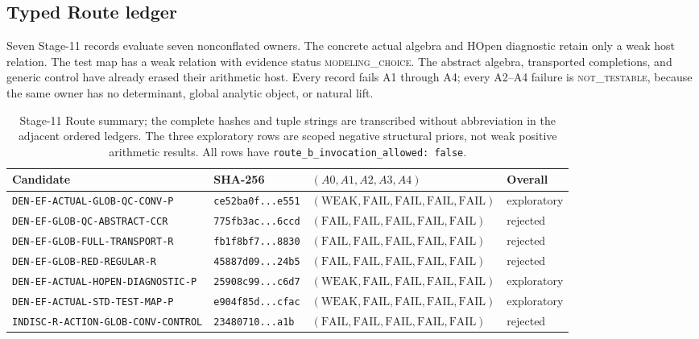 \documentclass[11pt]{article}
\theoremstyle{definition}
\begin{document}
\subsection{Typed Route ledger}

Seven Stage-11 records evaluate seven nonconflated owners.  The concrete
actual algebra and HOpen diagnostic retain only a weak host relation.  The
test map has a weak relation with evidence status \textsc{modeling\_choice}.
The abstract algebra, transported completions, and generic control have
already erased their arithmetic host.  Every record fails A1 through A4;
every A2--A4 failure is \textsc{not\_testable}, because the same owner has no
determinant, global analytic object, or natural lift.

\begin{table}[htbp]
\centering\scriptsize
\caption{Stage-11 Route summary; the complete hashes and tuple strings are
transcribed without abbreviation in the adjacent ordered ledgers.  The three
exploratory rows are scoped negative structural priors, not weak positive
arithmetic results.  All rows have
\texttt{route\_b\_invocation\_allowed: false}.}
\label{tab:route-ledger}
\begin{tabularx}{\textwidth}{P{0.20\textwidth}P{0.22\textwidth}P{0.34\textwidth}Y}
\toprule
Candidate & SHA-256 & $(A0,A1,A2,A3,A4)$ & Overall \\
\midrule
\texttt{DEN-EF-ACTUAL-GLOB-QC-CONV-P} & \texttt{ce52ba0f...e551} & $(\mathrm{WEAK},\mathrm{FAIL},\mathrm{FAIL},\mathrm{FAIL},\mathrm{FAIL})$ & exploratory \\
\texttt{DEN-EF-GLOB-QC-ABSTRACT-CCR} & \texttt{775fb3ac...6ccd} & $(\mathrm{FAIL},\mathrm{FAIL},\mathrm{FAIL},\mathrm{FAIL},\mathrm{FAIL})$ & rejected \\
\texttt{DEN-EF-GLOB-FULL-TRANSPORT-R} & \texttt{fb1f8bf7...8830} & $(\mathrm{FAIL},\mathrm{FAIL},\mathrm{FAIL},\mathrm{FAIL},\mathrm{FAIL})$ & rejected \\
\texttt{DEN-EF-GLOB-RED-REGULAR-R} & \texttt{45887d09...24b5} & $(\mathrm{FAIL},\mathrm{FAIL},\mathrm{FAIL},\mathrm{FAIL},\mathrm{FAIL})$ & rejected \\
\texttt{DEN-EF-ACTUAL-HOPEN-DIAGNOSTIC-P} & \texttt{25908c99...c6d7} & $(\mathrm{WEAK},\mathrm{FAIL},\mathrm{FAIL},\mathrm{FAIL},\mathrm{FAIL})$ & exploratory \\
\texttt{DEN-EF-ACTUAL-STD-TEST-MAP-P} & \texttt{e904f85d...cfac} & $(\mathrm{WEAK},\mathrm{FAIL},\mathrm{FAIL},\mathrm{FAIL},\mathrm{FAIL})$ & exploratory \\
\texttt{INDISC-R-ACTION-GLOB-CONV-CONTROL} & \texttt{23480710...a1b} & $(\mathrm{FAIL},\mathrm{FAIL},\mathrm{FAIL},\mathrm{FAIL},\mathrm{FAIL})$ & rejected \\
\bottomrule
\end{tabularx}
\end{table}
\end{document}
